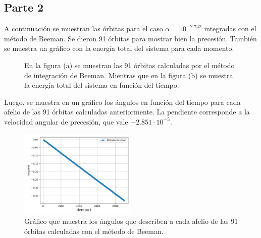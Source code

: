 \documentclass[letterpaper,oneside]{article}
\begin{document}
\subsection{Parte 2}
A continuación se muestran las órbitas para el caso $\alpha = 10^{-2.742}$ integradas con el método de Beeman. Se dieron 91 órbitas para mostrar bien la precesión. También se muestra un gráfico con la energía total del sistema para cada momento.
\begin{figure}
    \centering
    \hfill
{}\hfill
\caption{En la figura (a) se muestran las 91 órbitas calculadas por el método de integración de Beeman. Mientras que en la figura (b) se muestra la energía total del sistema en función del tiempo.}
\end{figure}
Luego, se muestra en un gráfico los ángulos en función del tiempo para cada afelio de las 91 órbitas calculadas anteriormente. La pendiente corresponde a la velocidad angular de precesión, que vale $-2.851 \cdot 10^{-5}$.
\begin{figure}
    \centering    
    \includegraphics[width=0.5\textwidth]{Tarea 3/velocidad angular de precesion.pdf}
    \caption{Gráfico que muestra los ángulos que describen a cada afelio de las 91 órbitas calculadas con el método de Beeman.}
    \label{vel de precesion}
\end{figure}{}
\end{document}
